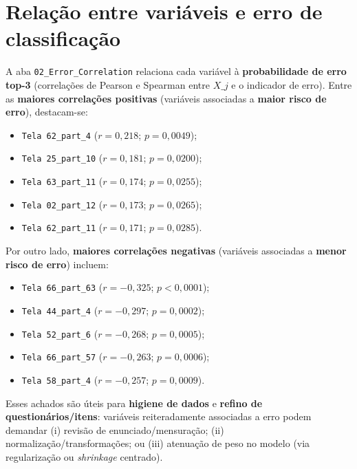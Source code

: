 \documentclass[12pt,a4paper]{article}
\begin{document}
\section{Relação entre variáveis e erro de classificação}
A aba \texttt{02\_Error\_Correlation} relaciona cada variável à \textbf{probabilidade de erro top-3} (correlações de Pearson e Spearman entre $X\_j$ e o indicador de erro). Entre as \textbf{maiores correlações positivas} (variáveis associadas a \textbf{maior risco de erro}), destacam-se:
\begin{itemize}[leftmargin=1.2cm]
  \item \texttt{Tela 62\_part\_4} ($r=0{,}218$; $p=0{,}0049$);
  \item \texttt{Tela 25\_part\_10} ($r=0{,}181$; $p=0{,}0200$);
  \item \texttt{Tela 63\_part\_11} ($r=0{,}174$; $p=0{,}0255$);
  \item \texttt{Tela 02\_part\_12} ($r=0{,}173$; $p=0{,}0265$);
  \item \texttt{Tela 62\_part\_11} ($r=0{,}171$; $p=0{,}0285$).
\end{itemize}
Por outro lado, \textbf{maiores correlações negativas} (variáveis associadas a \textbf{menor risco de erro}) incluem:
\begin{itemize}[leftmargin=1.2cm]
  \item \texttt{Tela 66\_part\_63} ($r=-0{,}325$; $p<0{,}0001$);
  \item \texttt{Tela 44\_part\_4} ($r=-0{,}297$; $p=0{,}0002$);
  \item \texttt{Tela 52\_part\_6} ($r=-0{,}268$; $p=0{,}0005$);
  \item \texttt{Tela 66\_part\_57} ($r=-0{,}263$; $p=0{,}0006$);
  \item \texttt{Tela 58\_part\_4} ($r=-0{,}257$; $p=0{,}0009$).
\end{itemize}
Esses achados são úteis para \textbf{higiene de dados} e \textbf{refino de questionários/itens}: variáveis reiteradamente associadas a erro podem demandar (i) revisão de enunciado/mensuração; (ii) normalização/transformações; ou (iii) atenuação de peso no modelo (via regularização ou \textit{shrinkage} centrado).
\end{document}
